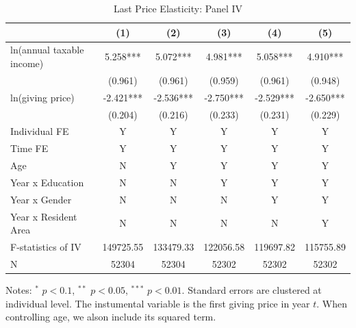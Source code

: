 \documentclass[
  11pt,
  a4paper,
]{article}
\begin{document}
  \begin{table}

  \caption{\label{tab:kableLastElasticity1}Last Price Elasticity: Panel IV}
  \centering
  \fontsize{7}{9}\selectfont
  \begin{threeparttable}
  \begin{tabular}[t]{lccccc}
  \toprule
   & (1) & (2) & (3) & (4) & (5)\\
  \midrule
  ln(annual taxable income) & 5.258*** & 5.072*** & 4.981*** & 5.058*** & 4.910***\\
   & (0.961) & (0.961) & (0.959) & (0.961) & (0.948)\\
  ln(giving price) & -2.421*** & -2.536*** & -2.750*** & -2.529*** & -2.650***\\
   & (0.204) & (0.216) & (0.233) & (0.231) & (0.229)\\
  Individual FE & Y & Y & Y & Y & Y\\
  Time FE & Y & Y & Y & Y & Y\\
  Age & N & Y & Y & Y & Y\\
  Year x Education & N & N & Y & Y & Y\\
  Year x Gender & N & N & N & Y & Y\\
  Year x Resident Area & N & N & N & N & Y\\
  F-statistics of IV & 149725.55 & 133479.33 & 122056.58 & 119697.82 & 115755.89\\
  N & 52304 & 52304 & 52302 & 52302 & 52302\\
  \bottomrule
  \end{tabular}
  \begin{tablenotes}
  \item Notes: $^{*}$ $p < 0.1$, $^{**}$ $p < 0.05$, $^{***}$ $p < 0.01$. Standard errors are clustered at individual level. The instumental variable is the first giving price in year $t$. When controlling age, we alson include its squared term.
  \end{tablenotes}
  \end{threeparttable}
  \end{table}
\end{document}
